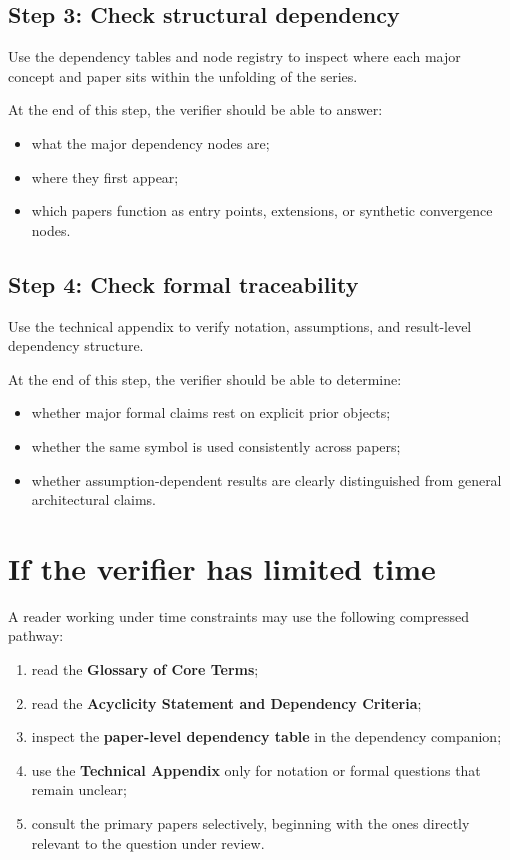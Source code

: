 \documentclass[11pt,a4paper]{article}
\begin{document}
\subsection*{Step 3: Check structural dependency}

Use the dependency tables and node registry to inspect where each major concept and paper sits
within the unfolding of the series.

At the end of this step, the verifier should be able to answer:
\begin{itemize}[leftmargin=2em]
	\item what the major dependency nodes are;
	\item where they first appear;
	\item which papers function as entry points, extensions, or synthetic convergence nodes.
\end{itemize}

\subsection*{Step 4: Check formal traceability}

Use the technical appendix to verify notation, assumptions, and result-level dependency structure.

At the end of this step, the verifier should be able to determine:
\begin{itemize}[leftmargin=2em]
	\item whether major formal claims rest on explicit prior objects;
	\item whether the same symbol is used consistently across papers;
	\item whether assumption-dependent results are clearly distinguished from general architectural claims.
\end{itemize}

\section{If the verifier has limited time}

A reader working under time constraints may use the following compressed pathway:

\begin{enumerate}[leftmargin=2em]
	\item read the \textbf{Glossary of Core Terms};
	\item read the \textbf{Acyclicity Statement and Dependency Criteria};
	\item inspect the \textbf{paper-level dependency table} in the dependency companion;
	\item use the \textbf{Technical Appendix} only for notation or formal questions that remain unclear;
	\item consult the primary papers selectively, beginning with the ones directly relevant to the question under review.
\end{enumerate}
\end{document}
